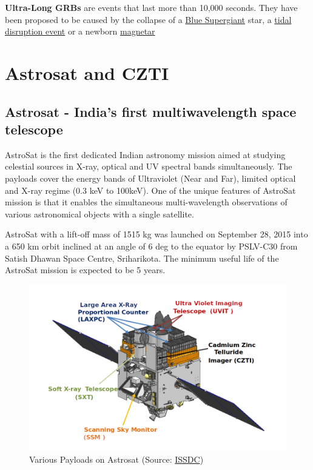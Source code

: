 \documentclass[11pt]{book} %
\begin{document}
\textbf{Ultra-Long GRBs} are events that last more than 10,000 seconds. They have been proposed to be caused by the collapse of a \href{https://en.wikipedia.org/wiki/Blue_supergiant}{Blue Supergiant} star, a \href{https://en.wikipedia.org/wiki/Tidal_disruption_event}{tidal disruption event} or a newborn \href{https://en.wikipedia.org/wiki/Magnetar}{magnetar}

\section{Astrosat and CZTI}
\subsection{Astrosat - India's first multiwavelength space telescope}
AstroSat is the first dedicated Indian astronomy mission aimed at studying celestial sources in X-ray, optical and UV spectral bands simultaneously. The payloads cover the energy bands of Ultraviolet (Near and Far), limited optical and X-ray regime (0.3 keV to 100keV). One of the unique features of AstroSat mission is that it enables the simultaneous multi-wavelength observations of various astronomical objects with a single satellite.

AstroSat with a lift-off mass of 1515 kg was launched on September 28, 2015 into a 650 km orbit inclined at an angle of 6 deg to the equator by PSLV-C30 from Satish Dhawan Space Centre, Sriharikota. The minimum useful life of the AstroSat mission is expected to be 5 years.


\begin{figure}
    \centering
    \includegraphics[scale=0.8]{Pictures/astrosat_wireframe.png}
    \caption{Various Payloads on Astrosat (Source: \href{https://webapps.issdc.gov.in/astro_archive/archive/astrosat_images/astrosat_wireframe.png}{ISSDC})}
\end{figure}
\end{document}
